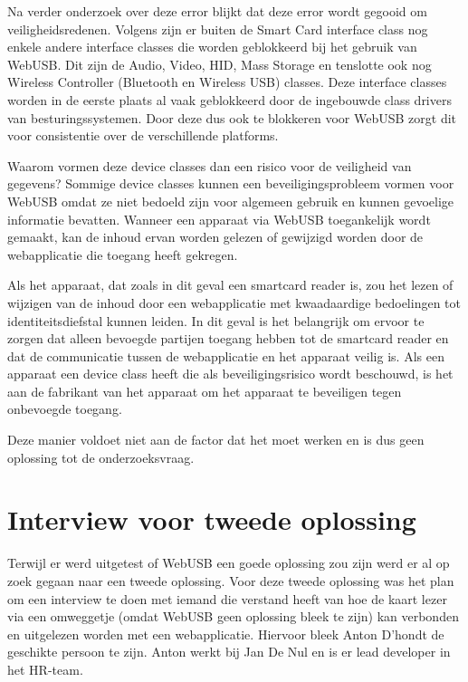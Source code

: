 Na verder onderzoek over deze error blijkt dat deze error wordt gegooid om veiligheidsredenen. Volgens \textcite{ReillyGrant} zijn er buiten de Smart Card interface class nog enkele andere interface classes die worden geblokkeerd bij het gebruik van WebUSB. Dit zijn de Audio, Video, HID, Mass Storage en tenslotte ook nog Wireless Controller (Bluetooth en Wireless USB) classes. Deze interface classes worden in de eerste plaats al vaak geblokkeerd door de ingebouwde class drivers van besturingssystemen. Door deze dus ook te blokkeren voor WebUSB zorgt dit voor consistentie over de verschillende platforms. 

Waarom vormen deze device classes dan een risico voor de veiligheid van gegevens? Sommige device classes kunnen een beveiligingsprobleem vormen voor WebUSB omdat ze niet bedoeld zijn voor algemeen gebruik en kunnen gevoelige informatie bevatten. Wanneer een apparaat via WebUSB toegankelijk wordt gemaakt, kan de inhoud ervan worden gelezen of gewijzigd worden door de webapplicatie die toegang heeft gekregen. 

Als het apparaat, dat zoals in dit geval een smartcard reader is, zou het lezen of wijzigen van de inhoud door een webapplicatie met kwaadaardige bedoelingen tot identiteitsdiefstal kunnen leiden. In dit geval is het belangrijk om ervoor te zorgen dat alleen bevoegde partijen toegang hebben tot de smartcard reader en dat de communicatie tussen de webapplicatie en het apparaat veilig is. Als een apparaat een device class heeft die als beveiligingsrisico wordt beschouwd, is het aan de fabrikant van het apparaat om het apparaat te beveiligen tegen onbevoegde toegang.

Deze manier voldoet niet aan de factor dat het moet werken en is dus geen oplossing tot de onderzoeksvraag.




\section{Interview voor tweede oplossing}
Terwijl er werd uitgetest of WebUSB een goede oplossing zou zijn werd er al op zoek gegaan naar een tweede oplossing. Voor deze tweede oplossing was het plan om een interview te doen met iemand die verstand heeft van hoe de kaart lezer via een omweggetje (omdat WebUSB geen oplossing bleek te zijn) kan verbonden en uitgelezen worden met een webapplicatie. Hiervoor bleek Anton D’hondt de geschikte persoon te zijn. Anton werkt bij Jan De Nul en is er lead developer in het HR-team. 

